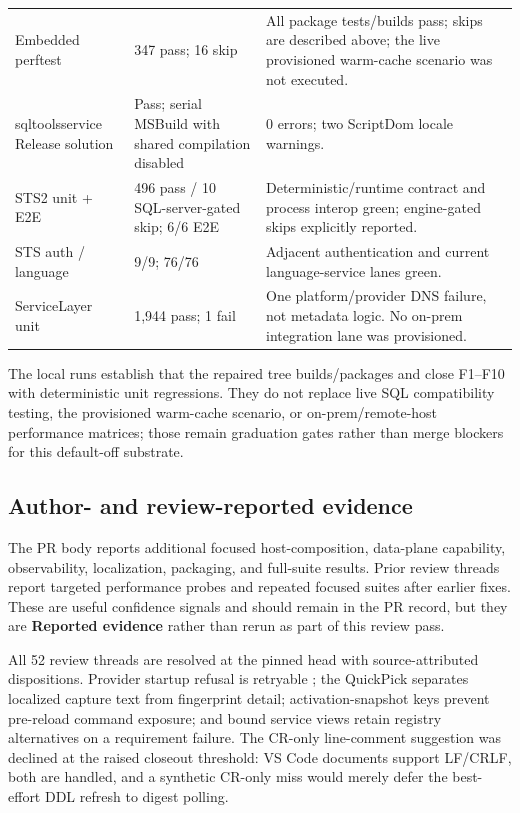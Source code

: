 \documentclass[11pt]{article}
\newcommand{\code}[1]{\texttt{\detokenize{#1}}}
\newcommand{\reported}{\textcolor{slate}{\textbf{Reported evidence}}}
\begin{document}
\begin{table}[H]
\begin{tabularx}{\textwidth}{@{}p{}p{}X@{}}
Embedded perftest & 347 pass; 16 skip & All package tests/builds pass; skips are described above; the live provisioned warm-cache scenario was not executed.\\
sqltoolsservice Release solution & Pass; serial MSBuild with shared compilation disabled & 0 errors; two ScriptDom locale warnings.\\
STS2 unit + E2E & 496 pass / 10 SQL-server-gated skip; 6/6 E2E & Deterministic/runtime contract and process interop green; engine-gated skips explicitly reported.\\
STS auth / language & 9/9; 76/76 & Adjacent authentication and current language-service lanes green.\\
ServiceLayer unit & 1,944 pass; 1 fail & One platform/provider DNS failure, not metadata logic. No on-prem integration lane was provisioned.\\
\bottomrule
\end{tabularx}
\end{table}

\begin{evidencebox}
The local runs establish that the repaired tree builds/packages and close F1--F10 with deterministic unit regressions. They do not replace live SQL compatibility testing, the provisioned warm-cache scenario, or on-prem/remote-host performance matrices; those remain graduation gates rather than merge blockers for this default-off substrate.
\end{evidencebox}

\subsection{Author- and review-reported evidence}

The PR body reports additional focused host-composition, data-plane capability, observability, localization, packaging, and full-suite results. Prior review threads report targeted performance probes and repeated focused suites after earlier fixes. These are useful confidence signals and should remain in the PR record, but they are \reported{} rather than rerun as part of this review pass.

All 52 review threads are resolved at the pinned head with source-attributed dispositions. Provider startup refusal is retryable \code{unavailable}; the QuickPick separates localized capture text from fingerprint detail; activation-snapshot keys prevent pre-reload command exposure; and bound service views retain registry alternatives on a requirement failure. The CR-only line-comment suggestion was declined at the raised closeout threshold: VS Code documents support LF/CRLF, both are handled, and a synthetic CR-only miss would merely defer the best-effort DDL refresh to digest polling.
\end{document}
